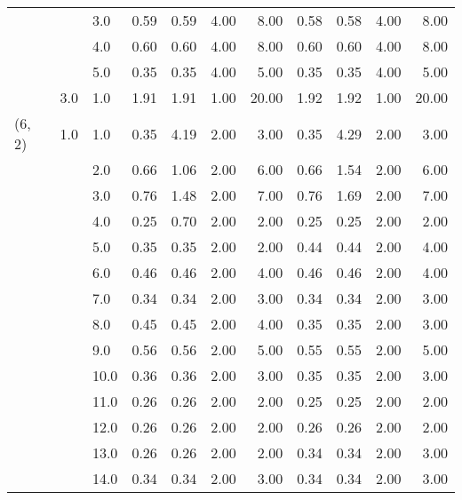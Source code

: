 \begin{tabular}{lllrrrrrrrr}
       &     & 3.0  &       0.59 &      0.59 & 4.00 &   8.00 &       0.58 &      0.58 & 4.00 &   8.00 \\
       &     & 4.0  &       0.60 &      0.60 & 4.00 &   8.00 &       0.60 &      0.60 & 4.00 &   8.00 \\
       &     & 5.0  &       0.35 &      0.35 & 4.00 &   5.00 &       0.35 &      0.35 & 4.00 &   5.00 \\
       & 3.0 & 1.0  &       1.91 &      1.91 & 1.00 &  20.00 &       1.92 &      1.92 & 1.00 &  20.00 \\
(6, 2) & 1.0 & 1.0  &       0.35 &      4.19 & 2.00 &   3.00 &       0.35 &      4.29 & 2.00 &   3.00 \\
       &     & 2.0  &       0.66 &      1.06 & 2.00 &   6.00 &       0.66 &      1.54 & 2.00 &   6.00 \\
       &     & 3.0  &       0.76 &      1.48 & 2.00 &   7.00 &       0.76 &      1.69 & 2.00 &   7.00 \\
       &     & 4.0  &       0.25 &      0.70 & 2.00 &   2.00 &       0.25 &      0.25 & 2.00 &   2.00 \\
       &     & 5.0  &       0.35 &      0.35 & 2.00 &   2.00 &       0.44 &      0.44 & 2.00 &   4.00 \\
       &     & 6.0  &       0.46 &      0.46 & 2.00 &   4.00 &       0.46 &      0.46 & 2.00 &   4.00 \\
       &     & 7.0  &       0.34 &      0.34 & 2.00 &   3.00 &       0.34 &      0.34 & 2.00 &   3.00 \\
       &     & 8.0  &       0.45 &      0.45 & 2.00 &   4.00 &       0.35 &      0.35 & 2.00 &   3.00 \\
       &     & 9.0  &       0.56 &      0.56 & 2.00 &   5.00 &       0.55 &      0.55 & 2.00 &   5.00 \\
       &     & 10.0 &       0.36 &      0.36 & 2.00 &   3.00 &       0.35 &      0.35 & 2.00 &   3.00 \\
       &     & 11.0 &       0.26 &      0.26 & 2.00 &   2.00 &       0.25 &      0.25 & 2.00 &   2.00 \\
       &     & 12.0 &       0.26 &      0.26 & 2.00 &   2.00 &       0.26 &      0.26 & 2.00 &   2.00 \\
       &     & 13.0 &       0.26 &      0.26 & 2.00 &   2.00 &       0.34 &      0.34 & 2.00 &   3.00 \\
       &     & 14.0 &       0.34 &      0.34 & 2.00 &   3.00 &       0.34 &      0.34 & 2.00 &   3.00 \\

\end{tabular}
